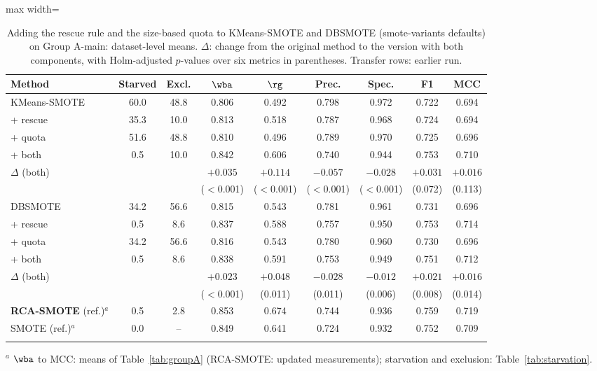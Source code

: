 \begin{table}[!htb]
\caption{Adding the rescue rule and the size-based quota to KMeans-SMOTE and DBSMOTE (smote-variants defaults) on Group A-main: dataset-level means. $\Delta$: change from the original method to the version with both components, with Holm-adjusted $p$-values over six metrics in parentheses. Transfer rows: earlier run.}\label{tab:transfer}
\centering\tabfont
\setlength{\tabcolsep}{2.4pt}
\begin{adjustbox}{max width=\textwidth}
\begin{tabular}{@{}lcccccccc@{}}
\toprule
Method & Starved & Excl. & $\wba$ & $\rg$ & Prec. & Spec. & F1 & MCC \\
\midrule
KMeans-SMOTE & 60.0 & 48.8 & 0.806 & 0.492 & 0.798 & 0.972 & 0.722 & 0.694 \\
\quad + rescue & 35.3 & 10.0 & 0.813 & 0.518 & 0.787 & 0.968 & 0.724 & 0.694 \\
\quad + quota & 51.6 & 48.8 & 0.810 & 0.496 & 0.789 & 0.970 & 0.725 & 0.696 \\
\quad + both & 0.5 & 10.0 & 0.842 & 0.606 & 0.740 & 0.944 & 0.753 & 0.710 \\
\quad $\Delta$ (both) & & & $+0.035$ & $+0.114$ & $-0.057$ & $-0.028$ & $+0.031$ & $+0.016$ \\
 & & & \scriptsize($<$0.001) & \scriptsize($<$0.001) & \scriptsize($<$0.001) & \scriptsize($<$0.001) & \scriptsize(0.072) & \scriptsize(0.113) \\
\midrule
DBSMOTE & 34.2 & 56.6 & 0.815 & 0.543 & 0.781 & 0.961 & 0.731 & 0.696 \\
\quad + rescue & 0.5 & 8.6 & 0.837 & 0.588 & 0.757 & 0.950 & 0.753 & 0.714 \\
\quad + quota & 34.2 & 56.6 & 0.816 & 0.543 & 0.780 & 0.960 & 0.730 & 0.696 \\
\quad + both & 0.5 & 8.6 & 0.838 & 0.591 & 0.753 & 0.949 & 0.751 & 0.712 \\
\quad $\Delta$ (both) & & & $+0.023$ & $+0.048$ & $-0.028$ & $-0.012$ & $+0.021$ & $+0.016$ \\
 & & & \scriptsize($<$0.001) & \scriptsize(0.011) & \scriptsize(0.011) & \scriptsize(0.006) & \scriptsize(0.008) & \scriptsize(0.014) \\
\midrule
\textbf{RCA-SMOTE} (ref.)$^{a}$ & 0.5 & 2.8 & 0.853 & 0.674 & 0.744 & 0.936 & 0.759 & 0.719 \\
SMOTE (ref.)$^{a}$ & 0.0 & -- & 0.849 & 0.641 & 0.724 & 0.932 & 0.752 & 0.709 \\
\botrule
\end{tabular}
\end{adjustbox}
\par\smallskip\raggedright\footnotesize $^{a}$ $\wba$ to MCC: means of Table~\ref{tab:groupA} (RCA-SMOTE: updated measurements); starvation and exclusion: Table~\ref{tab:starvation}.
\end{table}
